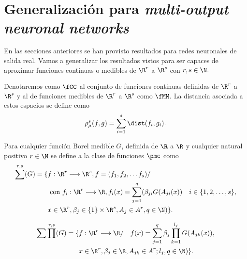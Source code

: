 %
\section{Generalización para \textit{multi-output neuronal networks}}

En las secciones anteriores se han provisto resultados para redes 
neuronales de salida real. Vamos a generalizar los resultados vistos
para ser capaces de aproximar funciones continuas o medibles 
de $\R^r$ a $\R^s$ con $r,s \in \N.$

Denotaremos como $\fCC$ al conjunto de funciones continuas definidas de $\R^r$ a $\R^s$ y al de funciones medibles de 
$\R^r$ a $\R^s$  como $\fMM.$ 
La distancia asociada a estos espacios se define como 
\begin{equation}
    \rho_{\mu}^s(f,g) 
    =
    \sum_{i=1}^s \dist(f_i, g_i).
\end{equation}
\begin{definicion} 
    Para cualquier función Borel medible $G$, definida de $\R$ a $\R$ y cualquier natural positivo
    $r \in \N$ se define a la clase de funciones $\pmc$ como 
    \begin{equation}
        \begin{split}
        \sum^{r,s}(G) = 
        \{ 
            & f: \R ^r \longrightarrow \R^s, f= (f_1, f_2, \ldots f_s)  / \quad 
            \\ &
            \text{ con } f_i : \R ^r\longrightarrow \R, 
            f_i(x)=\sum_{j = 1} ^q (
            \beta_{j i} G(A_{j i}(x)) \quad i \in \{1,2,\ldots, s\}, \\
            & x  \in \R ^r, \beta_j \in \{1\} \times \R^s, A_{j}\in A^r,q \in \N
            )
        \}.
        \end{split}
    \end{equation}
\end{definicion}

\begin{definicion} 
    \begin{equation} 
        \begin{split}
        \sum \prod^{r, s}(G) = \{ 
        &f: \R^r \longrightarrow \R / \quad
        f(x) = \sum_{j = 1} ^q  \beta_j \prod_{k=1}^{l_j}
        G(A_{jk}(x)), \\
        &x  \in \R^r, \beta_j \in \R, A_{jk}\in A^r; l_j,q \in \N
        )
        \}.
    \end{split}
    \end{equation} 
\end{definicion}

